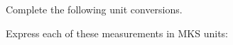 \documentclass[11pt]{exam}
\begin{document}
\begin{questions}


  
  \question Complete the following unit conversions.

  \begin{multicols}{2}
  \end{multicols}

  \question Express each of these measurements in MKS units:

  \begin{multicols}{2}
\end{multicols}
\end{questions}
\end{document}
